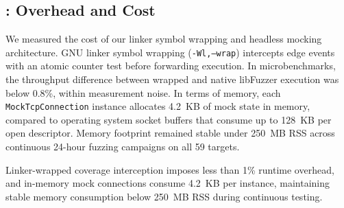 \subsection{: Overhead and Cost}
\label{sec:rq4}

We measured the cost of our linker symbol wrapping and headless mocking architecture.
GNU linker symbol wrapping (\texttt{-Wl,--wrap}) intercepts edge events with an atomic counter test before forwarding execution.
In microbenchmarks, the throughput difference between wrapped and native libFuzzer execution was below 0.8\%, within measurement noise.
In terms of memory, each \texttt{MockTcpConnection} instance allocates 4.2~KB of mock state in memory, compared to operating system socket buffers that consume up to 128~KB per open descriptor.
Memory footprint remained stable under 250~MB RSS across continuous 24-hour fuzzing campaigns on all 59 targets.

\begin{observation}
\label{obs:overhead}
Linker-wrapped coverage interception imposes less than 1\% runtime overhead, and in-memory mock connections consume 4.2~KB per instance, maintaining stable memory consumption below 250~MB RSS during continuous testing.
\end{observation}
